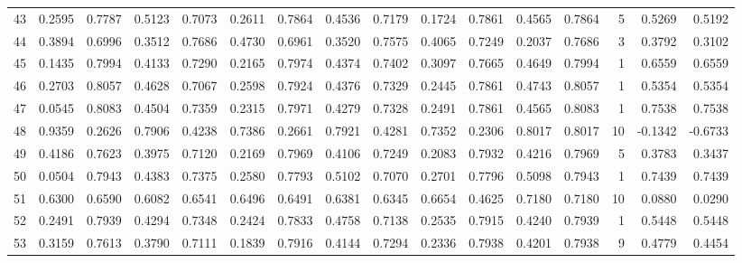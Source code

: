 \begin{tabular}{lrrrrrrrrrrrrrrr}
43  &      0.2595 &  0.7787 &  0.5123 &  0.7073 &  0.2611 &  0.7864 &  0.4536 &  0.7179 &  0.1724 &  0.7861 &   0.4565 &     0.7864 &      5 &                    0.5269 &                     0.5192 \\
44  &      0.3894 &  0.6996 &  0.3512 &  0.7686 &  0.4730 &  0.6961 &  0.3520 &  0.7575 &  0.4065 &  0.7249 &   0.2037 &     0.7686 &      3 &                    0.3792 &                     0.3102 \\
45  &      0.1435 &  0.7994 &  0.4133 &  0.7290 &  0.2165 &  0.7974 &  0.4374 &  0.7402 &  0.3097 &  0.7665 &   0.4649 &     0.7994 &      1 &                    0.6559 &                     0.6559 \\
46  &      0.2703 &  0.8057 &  0.4628 &  0.7067 &  0.2598 &  0.7924 &  0.4376 &  0.7329 &  0.2445 &  0.7861 &   0.4743 &     0.8057 &      1 &                    0.5354 &                     0.5354 \\
47  &      0.0545 &  0.8083 &  0.4504 &  0.7359 &  0.2315 &  0.7971 &  0.4279 &  0.7328 &  0.2491 &  0.7861 &   0.4565 &     0.8083 &      1 &                    0.7538 &                     0.7538 \\
48  &      0.9359 &  0.2626 &  0.7906 &  0.4238 &  0.7386 &  0.2661 &  0.7921 &  0.4281 &  0.7352 &  0.2306 &   0.8017 &     0.8017 &     10 &                   -0.1342 &                    -0.6733 \\
49  &      0.4186 &  0.7623 &  0.3975 &  0.7120 &  0.2169 &  0.7969 &  0.4106 &  0.7249 &  0.2083 &  0.7932 &   0.4216 &     0.7969 &      5 &                    0.3783 &                     0.3437 \\
50  &      0.0504 &  0.7943 &  0.4383 &  0.7375 &  0.2580 &  0.7793 &  0.5102 &  0.7070 &  0.2701 &  0.7796 &   0.5098 &     0.7943 &      1 &                    0.7439 &                     0.7439 \\
51  &      0.6300 &  0.6590 &  0.6082 &  0.6541 &  0.6496 &  0.6491 &  0.6381 &  0.6345 &  0.6654 &  0.4625 &   0.7180 &     0.7180 &     10 &                    0.0880 &                     0.0290 \\
52  &      0.2491 &  0.7939 &  0.4294 &  0.7348 &  0.2424 &  0.7833 &  0.4758 &  0.7138 &  0.2535 &  0.7915 &   0.4240 &     0.7939 &      1 &                    0.5448 &                     0.5448 \\
53  &      0.3159 &  0.7613 &  0.3790 &  0.7111 &  0.1839 &  0.7916 &  0.4144 &  0.7294 &  0.2336 &  0.7938 &   0.4201 &     0.7938 &      9 &                    0.4779 &                     0.4454 \\

\end{tabular}
